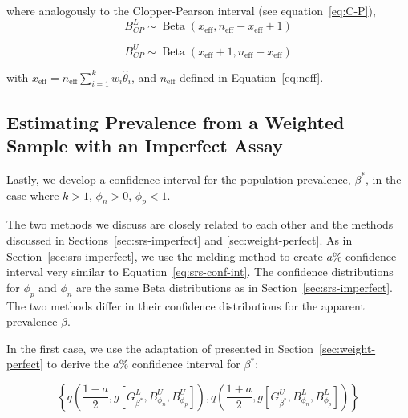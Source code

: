 \documentclass[AMA,STIX1COL]{WileyNJD-v2}
\begin{document}
where analogously to the Clopper-Pearson interval (see equation~\ref{eq:C-P}),
\begin{equation*}
    B^L_{CP} \sim \operatorname{Beta}\left(x_{\text{eff}},  n_{\text{eff}} -  x_{\text{eff}} + 1 \right)
\end{equation*}

\begin{equation*}
    B^U_{CP} \sim \operatorname{Beta}\left(x_{\text{eff}} + 1, n_{\text{eff}} - x_{\text{eff}} \right)
\end{equation*}

with \( x_{\text{eff}} = n_{\text{eff}} \sum_{i=1}^k w_i \hat{\theta}_i \), and \( n_{\text{eff}} \) defined in Equation~\ref{eq:neff}.

\subsection{Estimating Prevalence from a Weighted Sample with an Imperfect Assay}
\label{sec:weight-imperfect}

Lastly, we develop a confidence interval for the population prevalence, \( \beta^* \), in the case where \( k > 1 \), \( \phi_n > 0 \), \( \phi_p < 1 \).

The two methods we discuss are closely related to each other and the methods discussed in Sections~\ref{sec:srs-imperfect} and \ref{sec:weight-perfect}.
As in Section~\ref{sec:srs-imperfect}, we use the melding method \cite{FayP:2015} to create \( a \)\% confidence interval very similar to Equation~\ref{eq:srs-conf-int}.
The confidence distributions for \( \phi_p \) and \( \phi_n \) are the same Beta distributions as in Section~\ref{sec:srs-imperfect}.
The two methods differ in their confidence distributions for the apparent prevalence \( \beta \).

In the first case, we use the adaptation of \cite{FayF:1997} presented in Section~\ref{sec:weight-perfect} to derive the \( a \)\% confidence interval for \( \beta^* \):

\begin{equation}
    \left\{ q \left( \frac{1 - a}{2}, %
    g \left[ G^L_{\beta^*}, B^U_{\phi_n}, B^U_{\phi_p} \right]
    \right),  q \left( \frac{1 + a}{2}, %
       g \left[G^U_{\beta^*}, B^L_{\phi_n}, B^L_{\phi_p} \right] \right)
       \right\}
\end{equation}
\end{document}
